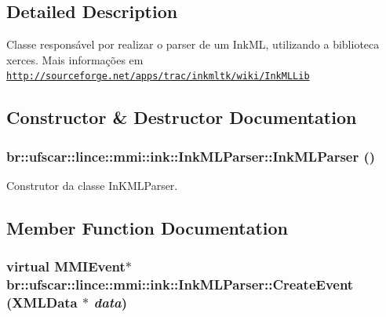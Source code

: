 \subsection{Detailed Description}
Classe responsável por realizar o parser de um InkML, utilizando a biblioteca xerces. Mais informações em \href{http://sourceforge.net/apps/trac/inkmltk/wiki/InkMLLib}{\tt http://sourceforge.net/apps/trac/inkmltk/wiki/InkMLLib} 

\subsection{Constructor \& Destructor Documentation}
\hypertarget{classbr_1_1ufscar_1_1lince_1_1mmi_1_1ink_1_1InkMLParser_a53b502493d849cc8244d5a831c0afe13}{
\subsubsection[{InkMLParser}]{\setlength{\rightskip}{0pt plus 5cm}br::ufscar::lince::mmi::ink::InkMLParser::InkMLParser ()}}
\label{classbr_1_1ufscar_1_1lince_1_1mmi_1_1ink_1_1InkMLParser_a53b502493d849cc8244d5a831c0afe13}


Construtor da classe InKMLParser. 



\subsection{Member Function Documentation}
\hypertarget{classbr_1_1ufscar_1_1lince_1_1mmi_1_1ink_1_1InkMLParser_aeb533c915bd5909319e3195f14993afa}{
\subsubsection[{CreateEvent}]{\setlength{\rightskip}{0pt plus 5cm}virtual {\bf MMIEvent}$\ast$ br::ufscar::lince::mmi::ink::InkMLParser::CreateEvent ({\bf XMLData} $\ast$ {\em data})}}
\label{classbr_1_1ufscar_1_1lince_1_1mmi_1_1ink_1_1InkMLParser_aeb533c915bd5909319e3195f14993afa}


